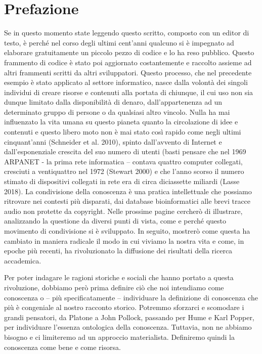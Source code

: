 \chapter*{Prefazione}

Se in questo momento state leggendo questo scritto, composto con un editor di testo, è
perché nel corso degli ultimi cent'anni qualcuno si è impegnato ad elaborare gratuitamente
un piccolo pezzo di codice e lo ha reso pubblico. Questo frammento di codice è stato poi
aggiornato costantemente e raccolto assieme ad altri frammenti scritti da altri sviluppatori.
Questo processo, che nel precedente esempio è stato applicato al settore informatico, nasce
dalla volontà dei singoli individui di creare risorse e contenuti alla portata di chiunque, il cui
uso non sia dunque limitato dalla disponibilità di denaro, dall'appartenenza ad un
determinato gruppo di persone o da qualsiasi altro vincolo. Nulla ha mai influenzato la vita
umana su questo pianeta quanto la circolazione di idee e contenuti e questo libero moto non
è mai stato così rapido come negli ultimi cinquant'anni (Schneider et al. 2010), spinto
dall'avvento di Internet e dall'esponenziale crescita del suo numero di utenti (basti pensare
che nel 1969 ARPANET - la prima rete informatica – contava quattro computer collegati,
cresciuti a ventiquattro nel 1972 (Stewart 2000) e che l'anno scorso il numero stimato di
dispositivi collegati in rete era di circa diciassette miliardi (Lasse 2018).
La condivisione della conoscenza è una pratica intellettuale che possiamo ritrovare
nei contesti più disparati, dai database bioinformatici alle brevi tracce audio non protette da
copyright. Nelle prossime pagine cercherò di illustrare, analizzando la questione da diversi
punti di vista, come e perché questo movimento di condivisione si è sviluppato. In seguito,
mostrerò come questa ha cambiato in maniera radicale il modo in cui viviamo la nostra vita
e come, in epoche più recenti, ha rivoluzionato la diffusione dei risultati della ricerca
accademica.

Per poter indagare le ragioni storiche e sociali che hanno portato a questa rivoluzione,
dobbiamo però prima definire ciò che noi intendiamo come conoscenza o – più
specificatamente – individuare la definizione di conoscenza che più è congeniale al nostro
racconto storico. Potremmo sforzarci e scomodare i grandi pensatori, da Platone a John
Pollock, passando per Hume e Karl Popper, per individuare l’essenza ontologica della
conoscenza. Tuttavia, non ne abbiamo bisogno e ci limiteremo ad un approccio materialista.
Definiremo quindi la conoscenza come bene e come risorsa.
